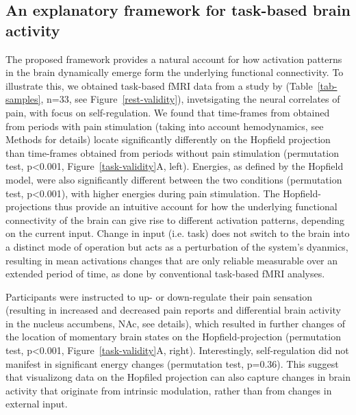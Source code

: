 \documentclass{article}
\begin{document}
\subsection{An explanatory framework for task-based brain activity}\label{An explanatory framework for task-based brain activity}

The proposed framework provides a natural account for how activation patterns in the brain dynamically emerge form the underlying functional connectivity. To illustrate this, we obtained task-based fMRI data from a study by \href{https://doi.org/10.1371/journal.pbio.1002036}{} (Table~\ref{tab-samples}, n=33, see Figure~\ref{rest-validity}), invetsigating the neural correlates of pain, with focus on self-regulation.
We found that time-frames from obtained from periods with pain stimulation (taking into account hemodynamics, see Methods for details) locate significantly differently on the Hopfield projection than time-frames obtained from periods without pain stimulation (permutation test, p\textless 0.001, Figure~\ref{task-validity}A, left). Energies, as defined by the Hopfield model, were also significantly different between the two conditions (permutation test, p\textless 0.001), with higher energies during pain stimulation. The Hopfield-projections thus provide an intuitive account for how the underlying functional connectivity of the brain can give rise to different activation patterns, depending on the current input. Change in input (i.e. task) does not switch to the brain into a distinct mode of operation but acts as a perturbation of the system's dyanmics, resulting in mean activations changes that are only reliable measurable over an extended period of time, as done by conventional task-based fMRI analyses.

Participants were instructed to up- or down-regulate their pain sensation (resulting in increased and decreased pain reports and differential brain activity in the nucleus accumbens, NAc, see \href{https://doi.org/10.1371/journal.pbio.1002036}{} details), which resulted in further changes of the location of momentary brain states on the Hopfield-projection (permutation test, p\textless 0.001, Figure~\ref{task-validity}A, right). Interestingly, self-regulation did not manifest in significant energy changes (permutation test, p=0.36). This suggest that visualizong data on the Hopfiled projection can also capture changes in brain activity that originate from intrinsic modulation, rather than from changes in external input.
\end{document}
